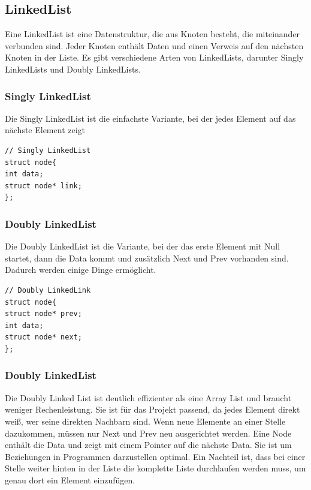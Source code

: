 \subsection{LinkedList}
Eine LinkedList ist eine Datenstruktur, die aus Knoten besteht, die miteinander verbunden sind. Jeder Knoten enthält Daten und einen Verweis auf den nächsten Knoten in der Liste. Es gibt verschiedene Arten von LinkedLists, darunter Singly LinkedLists und Doubly LinkedLists.

\subsubsection{Singly LinkedList}
Die Singly LinkedList ist die einfachste Variante, bei der jedes Element auf das nächste Element zeigt

\begin{verbatim}
// Singly LinkedList
struct node{
int data;
struct node* link;
};
\end{verbatim}

\subsubsection{Doubly LinkedList}
Die Doubly LinkedList ist die Variante, bei der das erste Element mit Null startet, dann die Data kommt und zusätzlich Next und Prev vorhanden sind. Dadurch werden einige Dinge ermöglicht.

\begin{verbatim}
// Doubly LinkedLink
struct node{
struct node* prev;
int data;
struct node* next;
};
\end{verbatim}

\subsubsection{Doubly LinkedList}
Die Doubly Linked List ist deutlich effizienter als eine Array List und braucht weniger Rechenleistung. Sie ist für das Projekt passend, da jedes Element direkt weiß, wer seine direkten Nachbarn sind. Wenn neue Elemente an einer Stelle dazukommen, müssen nur Next und Prev neu ausgerichtet werden.
Eine Node enthält die Data und zeigt mit einem Pointer auf die nächste Data. Sie ist um Beziehungen in Programmen darzustellen optimal.
Ein Nachteil ist, dass bei einer Stelle weiter hinten in der Liste die komplette Liste durchlaufen werden muss, um genau dort ein Element einzufügen.
